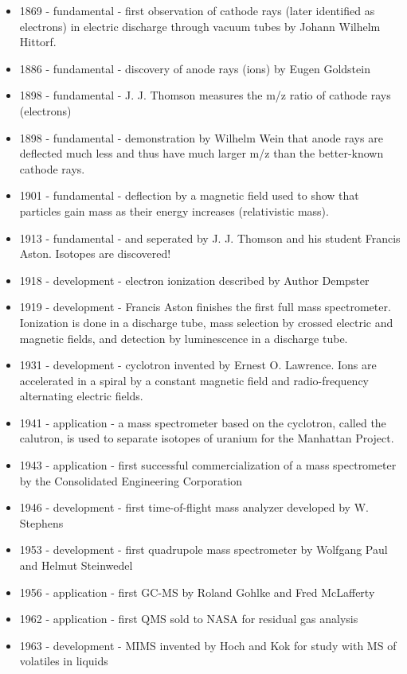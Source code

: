 \begin{itemize}
	\item 1869 - fundamental - first observation of cathode rays (later identified as electrons) in electric discharge through vacuum tubes by Johann Wilhelm Hittorf.
	\item 1886 - fundamental - discovery of anode rays (ions) by Eugen Goldstein
	\item 1898 - fundamental - J. J. Thomson measures the m/z ratio of cathode rays (electrons)
	\item 1898 - fundamental - demonstration by Wilhelm Wein that anode rays are deflected much less and thus have much larger m/z than the better-known cathode rays.
	\item 1901 - fundamental - deflection by a magnetic field used to show that particles gain mass as their energy increases (relativistic mass).
	\item 1913 - fundamental -  and  seperated by J. J. Thomson and his student Francis Aston. Isotopes are discovered!
	\item 1918 - development - electron ionization described by Author Dempster
	\item 1919 - development - Francis Aston finishes the first full mass spectrometer. Ionization is done in a discharge tube, mass selection by crossed electric and magnetic fields, and detection by luminescence in a discharge tube.
	\item 1931 - development - cyclotron invented by Ernest O. Lawrence. Ions are accelerated in a spiral by a constant magnetic field and radio-frequency alternating electric fields.
	\item 1941 - application - a mass spectrometer based on the cyclotron, called the calutron, is used to separate isotopes of uranium for the Manhattan Project.
	\item 1943 - application - first successful commercialization of a mass spectrometer by the Consolidated Engineering Corporation
	\item 1946 - development - first time-of-flight mass analyzer developed by W. Stephens
	\item 1953 - development - first quadrupole mass spectrometer by Wolfgang Paul and Helmut Steinwedel
	\item 1956 - application - first GC-MS by Roland Gohlke and Fred McLafferty
	\item 1962 - application - first QMS sold to NASA for residual gas analysis
	\item 1963 - development - MIMS invented by Hoch and Kok for study with MS of volatiles in liquids

\end{itemize}
